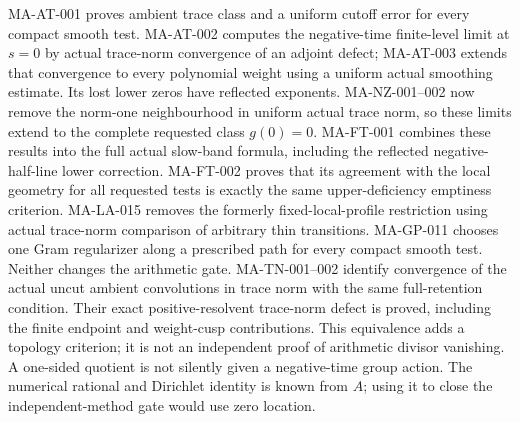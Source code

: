 \documentclass[11pt,a4paper]{article}
\begin{document}
MA-AT-001 proves ambient trace class and a uniform cutoff error
for every compact smooth test. MA-AT-002 computes the negative-time
finite-level limit at $s=0$ by actual trace-norm convergence of
an adjoint defect; MA-AT-003 extends that convergence to every
polynomial weight using a uniform actual smoothing estimate.
Its lost lower zeros have reflected exponents. MA-NZ-001--002
now remove the norm-one neighbourhood in uniform actual trace norm,
so these limits extend to the complete requested class $g(0)=0$.
MA-FT-001 combines these results into the full actual slow-band
formula, including the reflected negative-half-line lower correction.
MA-FT-002 proves that its agreement with the local geometry for all
requested tests is exactly the same upper-deficiency emptiness criterion.
MA-LA-015 removes the formerly fixed-local-profile restriction
using actual trace-norm comparison of arbitrary thin transitions.
MA-GP-011 chooses one Gram regularizer along a prescribed path
for every compact smooth test. Neither changes the arithmetic gate.
MA-TN-001--002 identify convergence of the actual uncut ambient
convolutions in trace norm with the same full-retention condition.
Their exact positive-resolvent trace-norm defect is proved,
including the finite endpoint and weight-cusp contributions.
This equivalence adds a topology criterion; it is not an
independent proof of arithmetic divisor vanishing.
A one-sided quotient is not silently given a negative-time group action.
The numerical rational and Dirichlet identity is known from $A$;
using it to close the independent-method gate would use zero location.
\end{document}
